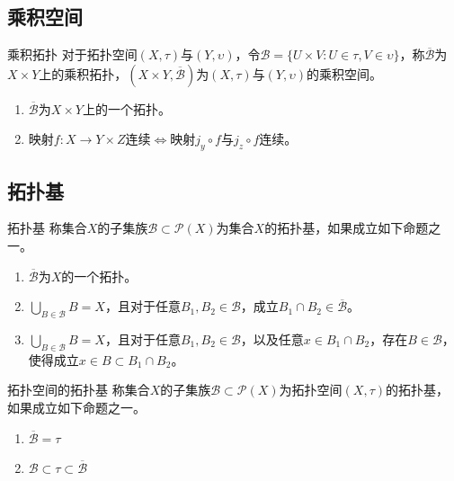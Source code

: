 \documentclass[lang = cn, scheme = chinese, thmcnt = section, usesamecnt]{elegantbook}
\newcommand{\sub}{\subset}             %
\begin{document}
\subsection{乘积空间}

\begin{definition}{乘积拓扑}
	对于拓扑空间$(X,\tau)$与$(Y,\upsilon)$，令$\mathscr{B}=\{ U\times V :U\in\tau,V\in\upsilon \}$，称$\overline{\mathscr{B}}$为$X\times Y$上的乘积拓扑，$(X\times Y,\overline{\mathscr{B}})$为$(X,\tau)$与$(Y,\upsilon)$的乘积空间。
\end{definition}

\begin{proposition}
	\begin{enumerate}
		\item $\overline{\mathscr{B}}$为$X\times Y$上的一个拓扑。
		\item 映射$f:X\to Y\times Z$连续$\iff$映射$j_y\circ f$与$j_z\circ f$连续。
	\end{enumerate}
\end{proposition}

\subsection{拓扑基}

\begin{definition}{拓扑基}
	称集合$X$的子集族$\mathscr{B}\sub\mathscr{P}(X)$为集合$X$的拓扑基，如果成立如下命题之一。
	\begin{enumerate}
		\item $\overline{\mathscr{B}}$为$X$的一个拓扑。
		\item $\displaystyle\bigcup_{B\in\mathscr{B}}B=X$，且对于任意$B_1,B_2\in\mathscr{B}$，成立$B_1\cap B_2\in\overline{\mathscr{B}}$。
		\item $\displaystyle\bigcup_{B\in\mathscr{B}}B=X$，且对于任意$B_1,B_2\in\mathscr{B}$，以及任意$x\in B_1\cap B_2$，存在$B\in\mathscr{B}$，使得成立$x\in B\sub B_1\cap B_2$。
	\end{enumerate}
\end{definition}

\begin{definition}{拓扑空间的拓扑基}
	称集合$X$的子集族$\mathscr{B}\sub\mathscr{P}(X)$为拓扑空间$(X,\tau)$的拓扑基，如果成立如下命题之一。
	\begin{enumerate}
		\item $\overline{\mathscr{B}}=\tau$
		\item $\mathscr{B}\sub \tau \sub \overline{\mathscr{B}}$
	\end{enumerate}
\end{definition}
\end{document}
